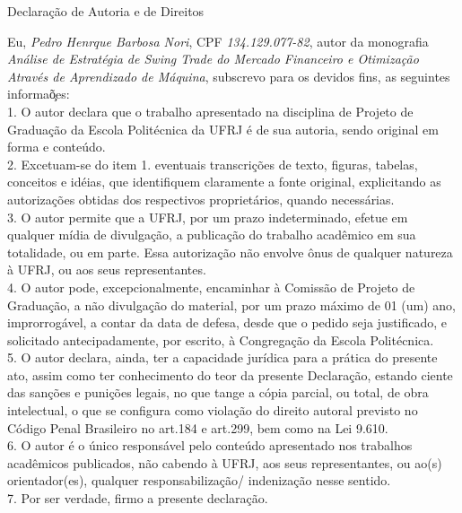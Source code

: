 \begin{center}
Declara\c{c}\~ao de Autoria e de Direitos
\end{center}

\vspace{0.5cm}

Eu, \emph{Pedro Henrque Barbosa Nori}, CPF \emph{134.129.077-82}, autor da monografia \emph{An\'alise de Estrat\'egia de Swing Trade do Mercado Financeiro e Otimiza\c{c}\~ao Atrav\'es de Aprendizado de M\'aquina}, subscrevo para os devidos fins, as seguintes informa\c\~oes:\\
1. O autor declara que o trabalho apresentado na disciplina de Projeto de Gradua\c{c}\~ao da Escola Polit\'ecnica da UFRJ \'e de sua autoria, sendo original em forma e conte\'udo.\\
2. Excetuam-se do item 1. eventuais transcri\c{c}\~oes de texto, figuras, tabelas, conceitos e id\'eias, que identifiquem claramente a fonte original, explicitando as autoriza\c{c}\~oes obtidas dos respectivos propriet\'arios, quando necess\'arias.\\
3. O autor permite que a UFRJ, por um prazo indeterminado, efetue em qualquer m\'idia de divulga\c{c}\~ao, a publica\c{c}\~ao do trabalho acad\^emico em sua totalidade, ou em parte. Essa autoriza\c{c}\~ao n\~ao envolve \^onus de qualquer natureza \`a UFRJ, ou aos seus representantes.\\
4. O autor pode, excepcionalmente, encaminhar \`a Comiss\~ao de Projeto de Gradua\c{c}\~ao, a n\~ao divulga\c{c}\~ao do material, por um prazo m\'aximo de 01 (um) ano, improrrog\'avel, a contar da data de defesa, desde que o pedido seja justificado, e solicitado antecipadamente, por escrito, \`a Congrega\c{c}\~ao da Escola Polit\'ecnica.\\
5. O autor declara, ainda, ter a capacidade jur\'idica para a pr\'atica do presente ato, assim como ter conhecimento do teor da presente Declara\c{c}\~ao, estando ciente das san\c{c}\~oes e puni\c{c}\~oes legais, no que tange a c\'opia parcial, ou total, de obra intelectual, o que se configura como viola\c{c}\~ao do direito autoral previsto no C\'odigo Penal Brasileiro no art.184 e art.299, bem como na Lei 9.610.\\
6. O autor \'e o \'unico respons\'avel pelo conte\'udo apresentado nos trabalhos acad\^emicos publicados, n\~ao cabendo \`a UFRJ, aos seus representantes, ou ao(s) orientador(es), qualquer responsabiliza\c{c}\~ao/ indeniza\c{c}\~ao nesse sentido.\\
7. Por ser verdade, firmo a presente declara\c{c}\~ao.\\

